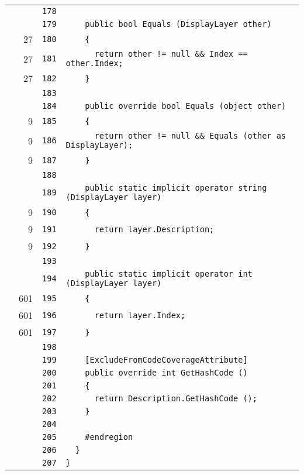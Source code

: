 \documentclass[a4paper,10pt]{article}
\begin{document}
\begin{longtable}[l]{lrrl}
\cellcolor{gray} &  & \verb~178~ & \verb~~\\
\cellcolor{gray} &  & \verb~179~ & \verb~    public bool Equals (DisplayLayer other)~\\
\cellcolor{green} & 27 & \verb~180~ & \verb~    {~\\
\cellcolor{green} & 27 & \verb~181~ & \verb~      return other != null && Index == other.Index;~\\
\cellcolor{green} & 27 & \verb~182~ & \verb~    }~\\
\cellcolor{gray} &  & \verb~183~ & \verb~~\\
\cellcolor{gray} &  & \verb~184~ & \verb~    public override bool Equals (object other)~\\
\cellcolor{green} & 9 & \verb~185~ & \verb~    {~\\
\cellcolor{green} & 9 & \verb~186~ & \verb~      return other != null && Equals (other as DisplayLayer);~\\
\cellcolor{green} & 9 & \verb~187~ & \verb~    }~\\
\cellcolor{gray} &  & \verb~188~ & \verb~~\\
\cellcolor{gray} &  & \verb~189~ & \verb~    public static implicit operator string (DisplayLayer layer)~\\
\cellcolor{green} & 9 & \verb~190~ & \verb~    {~\\
\cellcolor{green} & 9 & \verb~191~ & \verb~      return layer.Description;~\\
\cellcolor{green} & 9 & \verb~192~ & \verb~    }~\\
\cellcolor{gray} &  & \verb~193~ & \verb~~\\
\cellcolor{gray} &  & \verb~194~ & \verb~    public static implicit operator int (DisplayLayer layer)~\\
\cellcolor{green} & 601 & \verb~195~ & \verb~    {~\\
\cellcolor{green} & 601 & \verb~196~ & \verb~      return layer.Index;~\\
\cellcolor{green} & 601 & \verb~197~ & \verb~    }~\\
\cellcolor{gray} &  & \verb~198~ & \verb~~\\
\cellcolor{gray} &  & \verb~199~ & \verb~    [ExcludeFromCodeCoverageAttribute]~\\
\cellcolor{gray} &  & \verb~200~ & \verb~    public override int GetHashCode ()~\\
\cellcolor{gray} &  & \verb~201~ & \verb~    {~\\
\cellcolor{gray} &  & \verb~202~ & \verb~      return Description.GetHashCode ();~\\
\cellcolor{gray} &  & \verb~203~ & \verb~    }~\\
\cellcolor{gray} &  & \verb~204~ & \verb~~\\
\cellcolor{gray} &  & \verb~205~ & \verb~    #endregion~\\
\cellcolor{gray} &  & \verb~206~ & \verb~  }~\\
\cellcolor{gray} &  & \verb~207~ & \verb~}~\\
\end{longtable}
\newpage
\end{document}
